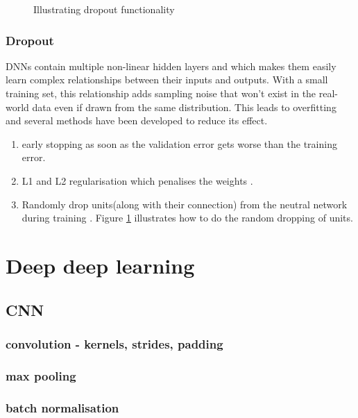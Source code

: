 \begin{figure}[h]
	\centering
    \def\svgwidth{0.5\textwidth}
    
    \caption{Illustrating dropout functionality}
    \label{fig:Dropout_function}
\end{figure}

\subsubsection*{Dropout}
DNNs contain multiple non-linear hidden layers and which makes them easily learn
complex relationships between their inputs and outputs. With a small training set, this
relationship adds sampling noise that won't exist in the real-world data even if drawn
from the same distribution. This leads to overfitting and several methods have been
developed to reduce its effect.
\begin{enumerate}
    \item early stopping as soon as the validation error gets worse than the training
        error.
    \item L1 and L2 regularisation which penalises the weights \cite{Schmidhuber_2015}.
    \item Randomly drop units(along with their connection) from the neutral network during
        training \cite{dropoutpaper}. Figure \ref{fig:Dropout_function} illustrates how to
        do the random dropping of units.
    \end{enumerate}

\section{Deep deep learning}



\subsection{CNN}
\subsubsection*{convolution - kernels, strides, padding}
\subsubsection*{max pooling}
\subsubsection*{batch normalisation}
